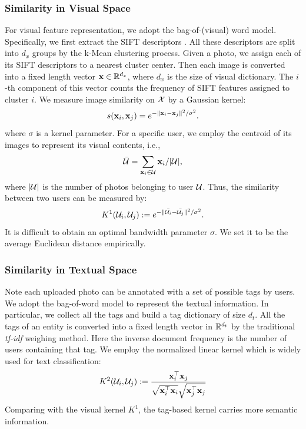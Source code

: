 \subsubsection{Similarity in Visual Space}

For visual feature representation, we adopt the bag-of-(visual) word model. Specifically, we first extract the SIFT descriptors \cite{jcv/LoweG04}. All these
descriptors are split into $d_x$ groups by the k-Mean clustering process. Given a photo, we assign each of its SIFT descriptors to a nearest cluster center.
Then each image is converted into a fixed length vector $\mathbf{x}\in{\mathbb R}^{d_x}$, where $d_x$ is the size of visual dictionary. The $i$-th component of this vector
counts the frequency of SIFT features assigned to cluster $i$.
We measure image similarity on ${\cal X}$ by a Gaussian kernel:
\[
s(\mathbf{x}_i,\mathbf{x}_j) = e^{-\|\mathbf{x}_i - \mathbf{x}_j\|^2/\sigma^2}.
\]
where $\sigma$ is a kernel parameter. For a specific user, we employ the centroid of its images to represent its visual contents, i.e.,
\[
\bar{{\cal U}}=\sum_{\mathbf{x}_i\in{\cal U}} \mathbf{x}_i / |{\cal U}|,
\]
where $|{\cal U} |$ is the number of photos belonging to user ${\cal U}$. Thus, the similarity between two users can be measured by:
\[
K^1({\cal U}_i,{\cal U}_j) := e^{-\| \bar{{\cal U}_i} - \bar{{\cal U}_j} \|^2 / \sigma^2}.
\]
It is difficult to obtain an optimal bandwidth parameter $\sigma$. We set it to be the average Euclidean distance empirically.

\subsubsection{Similarity in Textual Space}

Note each uploaded photo can be annotated with a set of possible tags by users. We adopt the bag-of-word model to represent the textual
information\cite{Baeza-YatesR99}. In particular, we collect all the tags and build a tag dictionary of size $d_t$. All the tags of an entity is converted into a
fixed length vector in ${\mathbb R}^{d_t}$ by the traditional {\em tf-idf} weighing method. Here the inverse document frequency is the number of users containing that
tag. We employ the normalized linear kernel which is widely used for text classification:
\[
K^2({\cal U}_i, {\cal U}_j) := \frac{\mathbf{x}_i^\top\mathbf{x}_j}{\sqrt{\mathbf{x}_i^\top\mathbf{x}_i}\sqrt{\mathbf{x}_j^\top\mathbf{x}_j}}
\]
Comparing with the visual kernel $K^1$, the tag-based kernel carries more semantic information.

